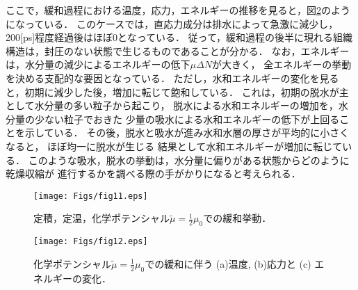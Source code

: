 ここで，緩和過程における温度，応力，エネルギーの推移を見ると，図\ref{fig:fig12}のようになっている．
このケースでは，直応力成分は排水によって急激に減少し，200[ps]程度経過後はほぼ0となっている．
従って，緩和過程の後半に現れる組織構造は，封圧のない状態で生じるものであることが分かる．
なお，エネルギーは，水分量の減少によるエネルギーの低下$\mu \Delta N$が大きく，
全エネルギーの挙動を決める支配的な要因となっている．
ただし，水和エネルギーの変化を見ると，初期に減少した後，増加に転じて飽和している．
これは，初期の脱水が主として水分量の多い粒子から起こり，
脱水による水和エネルギーの増加を，水分量の少ない粒子でおきた
少量の吸水による水和エネルギーの低下が上回ることを示している．
その後，脱水と吸水が進み水和水層の厚さが平均的に小さくなると，
ほぼ均一に脱水が生じる
結果として水和エネルギーが増加に転じている．
このような吸水，脱水の挙動は，水分量に偏りがある状態からどのように乾燥収縮が
進行するかを調べる際の手がかりになると考えられる．
\begin{figure}[h]
	\begin{center}
	\texttt{[image: Figs/fig11.eps]} 
	\end{center}
	\caption{
		定積，定温，化学ポテンシャル$\tilde \mu =\frac{1}{2}\mu_0$での緩和挙動．
	} 
	\label{fig:fig11}
\end{figure}
\begin{figure}[h]
	\begin{center}
	\texttt{[image: Figs/fig12.eps]} 
	\end{center}
	\caption{
		化学ポテンシャル$\tilde \mu =\frac{1}{2}\mu_0$での緩和に伴う
		(a)温度, (b)応力と (c) エネルギーの変化．
	} 
	\label{fig:fig12}
\end{figure}

